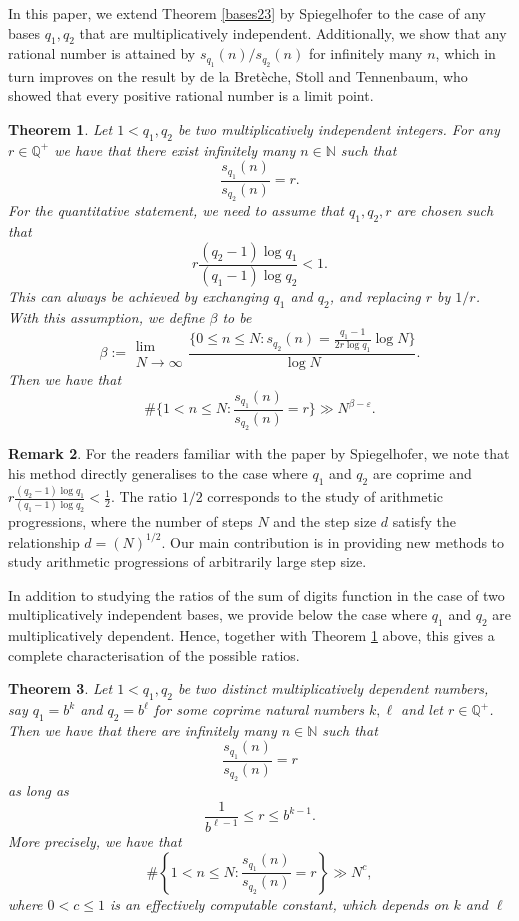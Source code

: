 \documentclass[12pt]{amsart}
\renewcommand{\leq}{\leqslant}
\newtheorem{theorem}{Theorem}[section]
\theoremstyle{definition}
\newtheorem{remark}[theorem]{Remark}
\numberwithin{equation}{section}
\newcommand\N{\mathbb{N}}
\newcommand\NN{\mathbb{N}}
\newcommand\QQ{\mathbb{Q}}
\numberwithin{equation}{section}
\begin{document}
In this paper, we extend Theorem \ref{bases23} by Spiegelhofer \cite{Spiegelhofer2023a} to the case of any bases $q_1,q_2$ that are multiplicatively independent. Additionally, we show that any rational number is attained by $s_{q_1}(n)/s_{q_2}(n)$ for infinitely many $n$, which in turn improves on the result by de la Bretèche, Stoll and Tennenbaum, who showed that every positive rational number is a limit point.\\
\begin{theorem}\label{main_thm_indep}
	Let $1<q_1,q_2$ be two multiplicatively independent integers. For any  $r\in \QQ^+$ we have that there exist infinitely many $n\in \NN$ such that
	\[
		\frac{s_{q_1}(n)}{s_{q_2}(n)}=r.
	\]
	For the quantitative statement, we need to assume that $q_1,q_2, r$ are chosen such that
	\[
		r \frac {(q_2-1)\log q_1}{(q_1-1)\log q_2} <1.
	\]
	This can always be achieved by exchanging $q_1$ and $q_2$, and replacing $r$ by $1/r$. With this assumption, we define $\beta$ to be 
	\[
		\beta:=\substack{\lim\\N\rightarrow\infty}\frac{\{0\leq n \leq N: s_{q_2}(n)= \frac{q_1-1}{2r\log q_1}\log N\}}{\log N}.
	\]
	Then we have that
	\[
		\#\{1<n\leq N: \frac{s_{q_1}(n)}{s_{q_2}(n)}=r\} \gg N^{\beta-\varepsilon}.
	\]
\end{theorem}
\begin{remark}
    For the readers familiar with the paper by Spiegelhofer, we note that his method directly generalises to the case where $q_1$ and $q_2$ are coprime and $r \frac {(q_2-1)\log q_1}{(q_1-1)\log q_2}<\frac 12$. The ratio $1/2$ corresponds to the study of arithmetic progressions, where the number of steps $N$ and the step size $d$ satisfy the relationship $d=(N)^{1/2}$. Our main contribution is in providing new methods to study arithmetic progressions of arbitrarily large step size.
\end{remark}


In addition to studying the ratios of the sum of digits function in the case of two multiplicatively independent bases, we provide below the case where $q_1$ and $q_2$ are multiplicatively dependent. Hence, together with Theorem \ref{main_thm_indep} above, this gives a complete characterisation of the possible ratios.
\begin{theorem}\label{main_thm_dep}
	Let $1<q_1,q_2$ be two distinct multiplicatively dependent numbers, say $q_1=b^k$ and $q_2=b^{\ell}$ for some coprime natural numbers $k,\ell$  and let $r\in \QQ^+$. Then we have that there are infinitely many $n\in \NN$ such that
	\[ 
		\frac{s_{q_1}(n)}{s_{q_2}(n)}=r
	\]
	as long as
	\[ 
		\frac{1}{b^{\ell-1}}\leq r \leq b^{k-1}.
	\]
More precisely, we have that
	\[
		\#\left\{1<n\leq N: \frac{s_{q_1}(n)}{s_{q_2}(n)}=r\right\} \gg N^{c},
	\]
	where $0<c\leq 1$ is an effectively computable constant, which depends on $k$ and $\ell$ 
\end{theorem}
\end{document}
